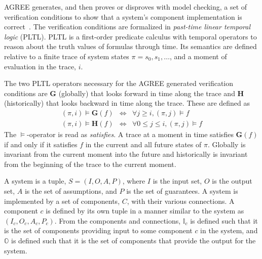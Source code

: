 
\newcommand{\globally}{\ensuremath{\mathbf{G}}}
\newcommand{\historically}{\ensuremath{\mathbf{H}}}
\newcommand{\assumes}{\ensuremath{A}}
\newcommand{\guarantees}{\ensuremath{P}}
\newcommand{\dispatch}{\ensuremath{\mathit{dispatch}}}
\newcommand{\complete}{\ensuremath{\mathit{complete}}}
\newcommand{\same}[1]{\ensuremath{\mathit{same}(#1)}}
\newcommand{\inputs}{\ensuremath{I}}
\newcommand{\outputs}{\ensuremath{O}}
\newcommand{\system}{\ensuremath{S}}
\newcommand{\components}{\ensuremath{C}}
\newcommand{\component}{\ensuremath{c}}
\newcommand{\schedule}{\ensuremath{\phi}}
\newcommand{\valid}{\ensuremath{\mathit{valid}}}
\newcommand{\dpred}{\ensuremath{\delta^\phi}}
\newcommand{\dispred}{\ensuremath{\mathbb{D}^\phi}}
\newcommand{\compred}{\ensuremath{\mathbb{C}^\phi}}
\newcommand{\dispredp}{\ensuremath{\mathbb{D}^{\phi\prime}}}
\newcommand{\compredp}{\ensuremath{\mathbb{C}^{\phi\prime}}}

AGREE generates, and then proves or disproves with model checking, a set of verification conditions to show that a system's component implementation is correct~\cite{agree2013}. 
The verification conditions are formalized in \emph{past-time linear temporal logic} (PLTL).
PLTL is a first-order predicate calculus with temporal operators to reason about the truth values of formulas through time.
Its semantics are defined relative to a finite trace of system states $\pi = s_0, s_1, \ldots$, and a moment of evaluation in the trace, $i$.

The two PLTL operators necessary for the AGREE generated verification conditions are $\globally$ (globally) that looks forward in time along the trace and $\historically$ (historically) that looks backward in time along the trace.
These are defined as
\begin{eqnarray*}
 (\pi, i) \models \globally(f) & \iff & \forall j \ge i, (\pi, j) \models f \\
(\pi, i) \models \historically(f) & \iff & \forall 0 \le j \le i, (\pi, j) \models f
\end{eqnarray*}
The $\models$-operator is read as \emph{satisfies}.
A trace at a moment in time satisfies $\globally(f)$ if and only if it satisfies $f$ in the current and all future states of $\pi$.
Globally is invariant from the current moment into the future and historically is invariant from the beginning of the trace to the current moment.

A system is a tuple, $\system = (\inputs, \outputs, \assumes, \guarantees)$, where $\inputs$ is the input set, $\outputs$ is the output set, $\assumes$ is the set of assumptions, and $\guarantees$ is the set of guarantees.
A system is implemented by a set of components, $\components$, with their various connections.
A component $\component$ is defined by its own tuple in a manner similar to the system as $(\inputs_\component, \outputs_\component, \assumes_\component, \guarantees_\component)$.
From the components and connections, $\mathbb{I}_\component$ is defined such that it is the set of components providing input to some component $\component$ in the system, and $\mathbb{O}$ is defined such that it is the set of components that provide the output for the system.


